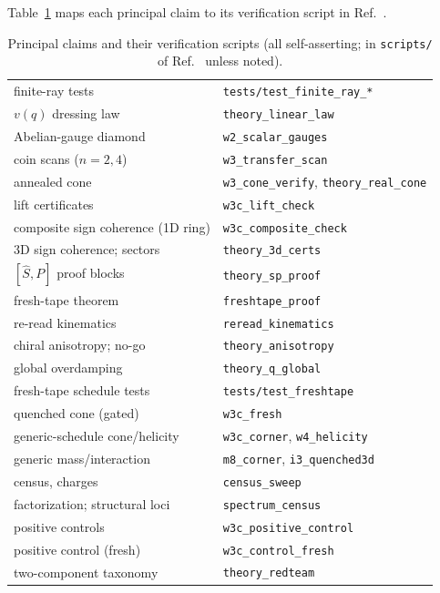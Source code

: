 \documentclass[aps,prd,twocolumn,superscriptaddress,nofootinbib,floatfix]{revtex4-2}
\begin{document}
Table~\ref{tab:claims} maps each principal claim to its verification
script in Ref.~\cite{repo}.

\begin{table}[!htb]
\caption{Principal claims and their verification scripts (all
self-asserting; in \texttt{scripts/} of Ref.~\cite{repo} unless noted).}
\label{tab:claims}
\begin{ruledtabular}
\scriptsize
\begin{tabular}{ll}
finite-ray tests & \texttt{tests/test\_finite\_ray\_*}\\
$v(q)$ dressing law & \texttt{theory\_linear\_law}\\
Abelian-gauge diamond & \texttt{w2\_scalar\_gauges}\\
coin scans ($n=2,4$) & \texttt{w3\_transfer\_scan}\\
annealed cone & \texttt{w3\_cone\_verify}, \texttt{theory\_real\_cone}\\
lift certificates & \texttt{w3c\_lift\_check}\\
composite sign coherence (1D ring) & \texttt{w3c\_composite\_check}\\
3D sign coherence; sectors & \texttt{theory\_3d\_certs}\\
$[\hat S,P]$ proof blocks & \texttt{theory\_sp\_proof}\\
fresh-tape theorem & \texttt{freshtape\_proof}\\
re-read kinematics & \texttt{reread\_kinematics}\\
chiral anisotropy; no-go & \texttt{theory\_anisotropy}\\
global overdamping & \texttt{theory\_q\_global}\\
fresh-tape schedule tests & \texttt{tests/test\_freshtape}\\
quenched cone (gated) & \texttt{w3c\_fresh}\\
generic-schedule cone/helicity & \texttt{w3c\_corner}, \texttt{w4\_helicity}\\
generic mass/interaction & \texttt{m8\_corner}, \texttt{i3\_quenched3d}\\
census, charges & \texttt{census\_sweep}\\
factorization; structural loci & \texttt{spectrum\_census}\\
positive controls & \texttt{w3c\_positive\_control}\\
positive control (fresh) & \texttt{w3c\_control\_fresh}\\
two-component taxonomy & \texttt{theory\_redteam}\\

\end{tabular}
\end{ruledtabular}
\end{table}
\end{document}
